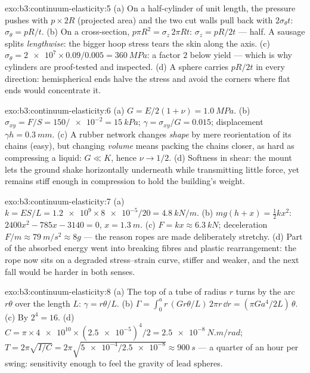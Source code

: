 \begin{solution}{exo:b3:continuum-elasticity:5}
(a) On a half-cylinder of unit length, the pressure pushes with $p
\times 2R$ (projected area) and the two cut walls pull back with
$2\sigma_\theta t$: $\sigma_\theta = pR/t$. (b) On a cross-section,
$p\pi R^2 = \sigma_z\,2\pi Rt$: $\sigma_z = pR/2t$ --- half. A
sausage splits \emph{lengthwise}: the bigger hoop stress tears the
skin along the axis. (c) $\sigma_\theta = \num{2e7} \times
0.09/0.005 = \qty{360}{MPa}$: a factor $2$ below yield --- which is
why cylinders are proof-tested and inspected. (d) A sphere carries
$pR/2t$ in every direction: hemispherical ends halve the stress and
avoid the corners where flat ends would concentrate it.
\end{solution}

\begin{solution}{exo:b3:continuum-elasticity:6}
(a) $G = E/2(1 + \nu) = \qty{1.0}{MPa}$. (b) $\sigma_{xy} = F/S =
150/\num{e-2} = \qty{15}{kPa}$; $\gamma = \sigma_{xy}/G = 0.015$;
displacement $\gamma h = \qty{0.3}{mm}$. (c) A rubber network changes
\emph{shape} by mere reorientation of its chains (easy), but changing
\emph{volume} means packing the chains closer, as hard as compressing
a liquid: $G \ll K$, hence $\nu \to 1/2$. (d) Softness in shear: the
mount lets the ground shake horizontally underneath while transmitting
little force, yet remains stiff enough in compression to hold the
building's weight.
\end{solution}

\begin{solution}{exo:b3:continuum-elasticity:7}
(a) $k = ES/L = \num{1.2e9} \times \num{8e-5}/20 = \qty{4.8}{kN/m}$.
(b) $mg(h + x) = \tfrac12 kx^2$: $2400x^2 - 785x - 3140 = 0$, $x =
\qty{1.3}{m}$. (c) $F = kx \approx \qty{6.3}{kN}$; deceleration $F/m
\approx \qty{79}{m/s^2} \approx 8g$ --- the reason ropes are made
deliberately stretchy. (d) Part of the absorbed energy went into
breaking fibres and plastic rearrangement: the rope now sits on a
degraded stress--strain curve, stiffer and weaker, and the next fall
would be harder in both senses.
\end{solution}

\begin{solution}{exo:b3:continuum-elasticity:8}
(a) The top of a tube of radius $r$ turns by the arc $r\theta$ over
the length $L$: $\gamma = r\theta/L$. (b) $\Gamma = \int_0^a r\,(G r\theta/L)\,
2\pi r\,\dd r = (\pi Ga^4/2L)\,\theta$. (c) By $2^4 = 16$. (d) $C =
\pi \times \num{4e10} \times (\num{2.5e-5})^4/2 =
\qty{2.5e-8}{N.m/rad}$; $T = 2\pi\sqrt{I/C} = 2\pi\sqrt{\num{5e-4}/
\num{2.5e-8}} \approx \qty{900}{s}$ --- a quarter of an hour per
swing: sensitivity enough to feel the gravity of lead spheres.
\end{solution}

